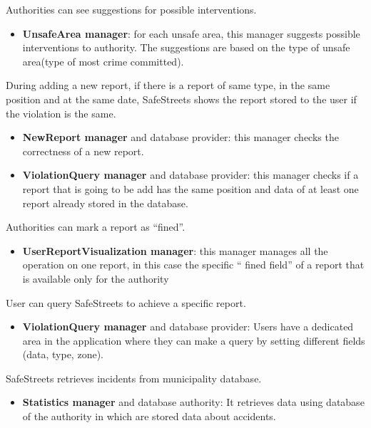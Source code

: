 \documentclass[../RASD.tex]{subfiles}
\begin{document}
\begin{enumerate}
         Authorities can see suggestions for possible interventions.
        \begin{itemize}
            \item \textbf{UnsafeArea manager}: for each unsafe area, this manager suggests possible interventions to authority.
            The suggestions are based on the type of unsafe area(type of most crime committed).
        \end{itemize}

         During adding a new report, if there is a report of same type, in the same position and at the same date,
        SafeStreets shows the report stored to the user if the violation is the same.
        \begin{itemize}
            \item \textbf{NewReport manager} and database provider: this manager checks the correctness of a new report.
            \item \textbf{ViolationQuery manager} and database provider: this manager checks if a report that is going to be add has the same position
            and data of at least one report already stored in the database.
        \end{itemize}

         Authorities can mark a report as “fined”.
        \begin{itemize}
            \item \textbf{UserReportVisualization manager}: this manager manages all the operation on one report, in this case the specific “ fined field”
            of a report that is available only for the authority
        \end{itemize}

         User can query SafeStreets to achieve a specific report.
        \begin{itemize}
            \item \textbf{ViolationQuery manager} and database provider: Users have a dedicated area in the application where they can make a query
            by setting different fields (data, type, zone).
        \end{itemize}

         SafeStreets retrieves incidents from municipality database.
        \begin{itemize}
            \item \textbf{Statistics manager} and database authority: It retrieves data using database of the authority in which are stored data about accidents.
        \end{itemize}
    \end{enumerate}
\end{document}
